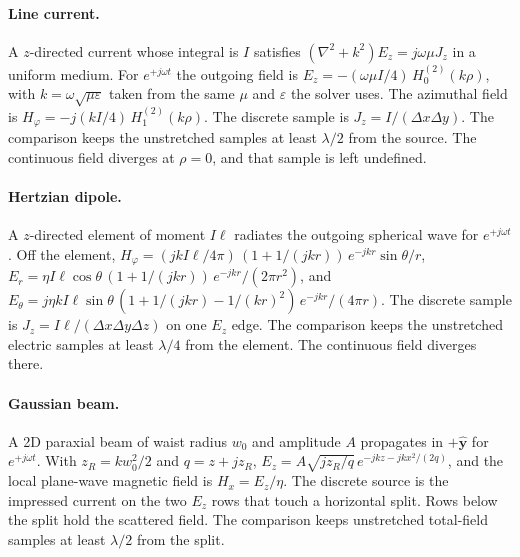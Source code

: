 \documentclass[11pt,a4paper]{article}
\begin{document}
\paragraph{Line current.}
A $z$-directed current whose integral is $I$ satisfies
$(\nabla^2+k^2)E_z=j\omega\mu J_z$ in a uniform medium. For $e^{+j\omega t}$
the outgoing field is
$E_z=-(\omega\mu I/4)\,H_0^{(2)}(k\rho)$, with
$k=\omega\sqrt{\mu\varepsilon}$ taken from the same $\mu$ and $\varepsilon$
the solver uses. The azimuthal field is
$H_\varphi=-j(k I/4)\,H_1^{(2)}(k\rho)$.
The discrete sample is $J_z=I/(\Delta x\Delta y)$. The
comparison keeps the unstretched samples at least $\lambda/2$ from the
source. The continuous field diverges at $\rho=0$, and that sample is left
undefined.

\paragraph{Hertzian dipole.}
A $z$-directed element of moment $I\ell$ radiates the outgoing spherical
wave for $e^{+j\omega t}$. Off the element,
$H_\varphi=(jk I\ell/4\pi)\,(1+1/(jkr))\,e^{-jkr}\sin\theta/r$,
$E_r=\eta I\ell\cos\theta\,(1+1/(jkr))\,e^{-jkr}/(2\pi r^2)$, and
$E_\theta=j\eta k I\ell\sin\theta\,(1+1/(jkr)-1/(kr)^2)\,e^{-jkr}/(4\pi r)$.
The discrete sample is $J_z=I\ell/(\Delta x\Delta y\Delta z)$ on one
$E_z$ edge. The comparison keeps the unstretched electric samples at
least $\lambda/4$ from the element. The continuous field diverges there.

\paragraph{Gaussian beam.}
A 2D paraxial beam of waist radius $w_0$ and amplitude $A$ propagates in
$+\hat{\mathbf{y}}$ for $e^{+j\omega t}$. With $z_R=kw_0^2/2$ and
$q=z+jz_R$,
$E_z=A\sqrt{j z_R/q}\,e^{-jkz-jkx^2/(2q)}$, and the local plane-wave
magnetic field is $H_x=E_z/\eta$. The discrete source is the impressed
current on the two $E_z$ rows that touch a horizontal split. Rows below
the split hold the scattered field. The comparison keeps unstretched
total-field samples at least $\lambda/2$ from the split.
\end{document}
